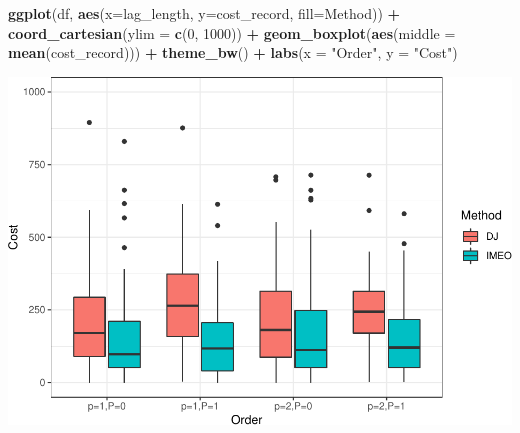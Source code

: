 \documentclass[
]{article}
\newenvironment{Shaded}{\begin{snugshade}}{\end{snugshade}}
\newcommand{\DataTypeTok}[1]{\textcolor[rgb]{0.13,0.29,0.53}{#1}}
\newcommand{\DecValTok}[1]{\textcolor[rgb]{0.00,0.00,0.81}{#1}}
\newcommand{\KeywordTok}[1]{\textcolor[rgb]{0.13,0.29,0.53}{\textbf{#1}}}
\newcommand{\NormalTok}[1]{#1}
\newcommand{\OperatorTok}[1]{\textcolor[rgb]{0.81,0.36,0.00}{\textbf{#1}}}
\newcommand{\StringTok}[1]{\textcolor[rgb]{0.31,0.60,0.02}{#1}}
\begin{document}
\begin{Shaded}
\end{Shaded}

\begin{Shaded}
\begin{Highlighting}[]
\KeywordTok{ggplot}\NormalTok{(df, }\KeywordTok{aes}\NormalTok{(}\DataTypeTok{x=}\NormalTok{lag_length, }\DataTypeTok{y=}\NormalTok{cost_record, }\DataTypeTok{fill=}\NormalTok{Method)) }\OperatorTok{+}
\StringTok{  }\KeywordTok{coord_cartesian}\NormalTok{(}\DataTypeTok{ylim =} \KeywordTok{c}\NormalTok{(}\DecValTok{0}\NormalTok{, }\DecValTok{1000}\NormalTok{)) }\OperatorTok{+}
\StringTok{  }\KeywordTok{geom_boxplot}\NormalTok{(}\KeywordTok{aes}\NormalTok{(}\DataTypeTok{middle =} \KeywordTok{mean}\NormalTok{(cost_record))) }\OperatorTok{+}\StringTok{ }\KeywordTok{theme_bw}\NormalTok{() }\OperatorTok{+}\StringTok{ }
\StringTok{  }\KeywordTok{labs}\NormalTok{(}\DataTypeTok{x =} \StringTok{"Order"}\NormalTok{, }\DataTypeTok{y =}  \StringTok{"Cost"}\NormalTok{)}
\end{Highlighting}
\end{Shaded}

\includegraphics{Real_files/figure-latex/boxplot-1.pdf}
\end{document}

